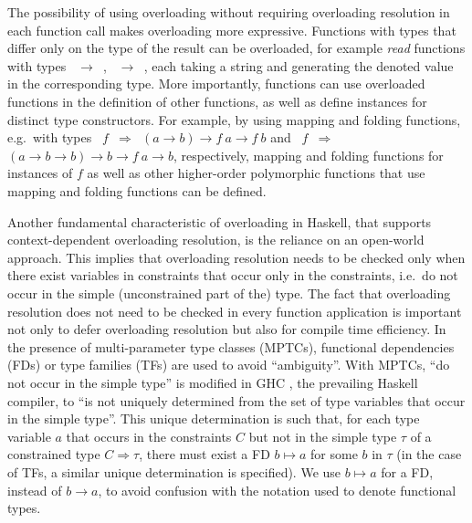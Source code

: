 The possibility of using overloading without requiring overloading
resolution in each function call makes overloading more
expressive. Functions with types that differ only on the type of the
result can be overloaded, for example {\em read\/} functions with
types {\tt \String\ $\rightarrow$ \Bool}, {\tt \String\ $\rightarrow$
  \Int}, each taking a string and generating the denoted value in the
corresponding type.  More importantly, functions can use overloaded
functions in the definition of other functions, as well as define
instances for distinct type constructors. For example, by using
mapping and folding functions, e.g.~with types {\tt \Functor\ $f$
  $\Rightarrow$ $(a\rightarrow b)\rightarrow f\:a\rightarrow f\:b$}
and {\tt \Foldable\ $f$ $\Rightarrow$ $(a\rightarrow b\rightarrow
  b)\rightarrow b\rightarrow f\:a\rightarrow b$}, respectively,
mapping and folding functions for instances of $f$ as well as other
higher-order polymorphic functions that use mapping and folding
functions can be defined.


Another fundamental characteristic of overloading in Haskell, that
supports context-dependent overloading resolution, is the reliance on
an open-world approach.
This implies that overloading resolution needs to be checked only when
there exist variables in constraints that occur only in the
constraints, i.e.~do not occur in the simple (unconstrained part of
the) type. The fact that overloading resolution does not need to be
checked in every function application is important not only to defer
overloading resolution but also for compile time efficiency.  In the
presence of multi-parameter type classes (MPTCs), functional
dependencies (FDs) \cite{Type-classes-with-FDs-MarkJones00,Jones:2008}
or type families (TFs) \cite{Chakravarty2005,Schrijvers:2008} are used
to avoid ``ambiguity''.  With MPTCs, ``do not occur in the simple
type'' is modified in GHC \cite{GHC}, the prevailing Haskell compiler,
to ``is not uniquely determined from the set of type variables that
occur in the simple type''. This unique determination is such that,
for each type variable $a$ that occurs in the constraints $C$ but not
in the simple type $\tau$ of a constrained type $C\Rightarrow \tau$,
there must exist a FD $b \mapsto a$ for some $b$ in $\tau$ (in the
case of TFs, a similar unique determination is specified). We use $b
\mapsto a$ for a FD, instead of $b \rightarrow a$, to avoid confusion
with the notation used to denote functional types.

